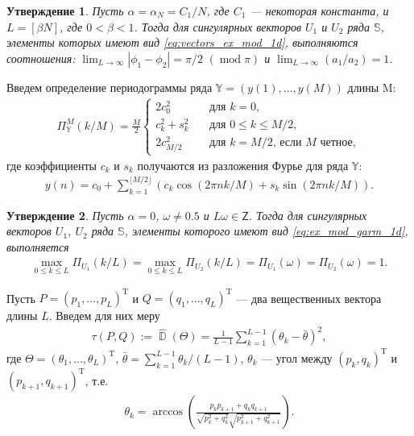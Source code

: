 \documentclass[specialist,
               substylefile = spbu.rtx,
               subf,href,colorlinks=true, 12pt]{disser}
\def\mod{\mathop{\mathrm{mod}}}
\DeclareMathOperator{\D}{\mathbb{D}}
\newtheorem{Th}{Утверждение}
\begin{document}
\begin{Th}  \cite[Утверждение 8]{Zhornikova2016} \label{th:aboutU1U2_ex_mod_1d}
Пусть $\alpha = \alpha_N = C_1/N$, где $C_1$ --- некоторая константа, и $L=[\beta N]$, где $0<\beta<1$. Тогда для сингулярных векторов $U_1$ и $U_2$ ряда $\mathbb{S}$, элементы которых имеют вид \eqref{eq:vectors_ex_mod_1d}, выполняются соотношения: $\lim_{L \rightarrow \infty}{|\phi_1-\phi_2|}=\pi/2 \,\,(\mod \pi)$ и $\lim_{L \rightarrow \infty}{(a_1/a_2)} = 1$.
\end{Th}


Введем определение периодограммы ряда $\mathbb{Y}=(y(1),\ldots,y({M}))$ длины M:
\begin{gather}
\label{eq:per}
 \Pi_{\mathbb{Y}}^M(k/M) = \frac{M}{2}
\begin{cases}
2c_0^2 &\quad \text{для } k = 0, \\
c_k^2 + s_k^2 & \quad \text{для }  0 \leqslant k \leqslant M/2, \\
2c_{M/2}^2 & \quad \text{для } k = M/2   \text{, если } M \text{ четное},
\end{cases}
\end{gather}
где коэффициенты $c_k$ и $s_k$ получаются из разложения Фурье для ряда $\mathbb{Y}$:
\begin{gather*}
y(n) = c_0 + \sum_{k=1}^{\lfloor M/2 \rfloor}\left(c_k\cos(2\pi n k /M) + s_k\sin(2\pi n k/M) \right).
\end{gather*}

\begin{Th}  \cite[Утверждение 3.1]{Alexandrov2006} \label{th:aleks1}
Пусть $\alpha = 0$, $\omega \not = 0.5$ и $L\omega \in \mathsf{Z}$. Тогда для сингулярных векторов $U_1$, $U_2$ ряда $\mathbb{S}$, элементы которого имеют вид \eqref{eq:ex_mod_garm_1d}, выполняется
\begin{gather*}
\max_{0 \leqslant k \leqslant L} \Pi_{U_1}(k/L) = \max_{0 \leqslant k \leqslant L} \Pi_{U_2}(k/L) =  \Pi_{U_1}(\omega) =  \Pi_{U_2}(\omega) = 1.
\end{gather*}
\end{Th}

Пусть $P = (p_1,\ldots,p_L)^{\mathrm{T}}$ и $Q=(q_1,\ldots,q_L)^{\mathrm{T}}$ --- два вещественных вектора длины $L$. Введем для них меру 
\begin{gather} \label{eq:tau1} 
\tau(P, Q) := \hat{\D}(\Theta) =\frac{1}{L-1}\sum_{k=1}^{L-1}{\left(\theta_k  - \bar{\theta}\right)^2},
\end{gather}
где $\Theta=(\theta_1,\ldots,\theta_L)^{\mathrm{T}}$,
$\bar{\theta} = \sum_{k=1}^{L-1}{\theta_k}/(L-1)$, $\theta_k$ --- угол между  
$\left(p_k, q_{k}\right)^{\mathrm{T}}$ и $\left(p_{k+1}, q_{k+1}\right)^{\mathrm{T}}$, т.е.
\begin{gather*}
\theta_k = \arccos{\left(\frac{p_{k} p_{k+1} + q_{k} q_{k+1}}{\sqrt{p_{k}^2+q_{k}^2}\sqrt{p_{k+1}^2+q_{k+1}^2}}\right)}.
\end{gather*}
\end{document}

